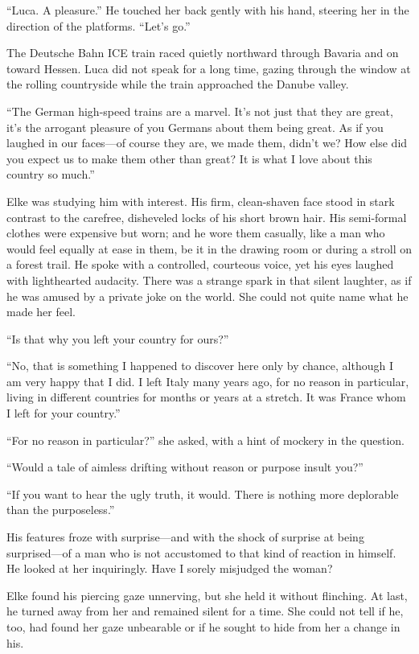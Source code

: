 ``Luca. A pleasure.'' He touched her back gently with his hand, steering her in the direction of the platforms. ``Let's go.''

\sectionline

The Deutsche Bahn ICE train raced quietly northward through Bavaria and on toward Hessen. Luca did not speak for a long time, gazing through the window at the rolling countryside while the train approached the Danube valley.

``The German high-speed trains are a marvel. It's not just that they are great, it's the arrogant pleasure of you Germans about them being great. As if you laughed in our faces---of course they are, we made them, didn't we? How else did you expect us to make them other than great? It is what I love about this country so much.''

Elke was studying him with interest. His firm, clean-shaven face stood in stark contrast to the carefree, disheveled locks of his short brown hair. His semi-formal clothes were expensive but worn; and he wore them casually, like a man who would feel equally at ease in them, be it in the drawing room or during a stroll on a forest trail. He spoke with a controlled, courteous voice, yet his eyes laughed with lighthearted audacity. There was a strange spark in that silent laughter, as if he was amused by a private joke on the world. She could not quite name what he made her feel.

``Is that why you left your country for ours?''

``No, that is something I happened to discover here only by chance, although I am very happy that I did. I left Italy many years ago, for no reason in particular, living in different countries for months or years at a stretch. It was France whom I left for your country.''

``For no reason in particular?'' she asked, with a hint of mockery in the question.

``Would a tale of aimless drifting without reason or purpose insult you?''

``If you want to hear the ugly truth, it would. There is nothing more deplorable than the purposeless.''

His features froze with surprise---and with the shock of surprise at being surprised---of a man who is not accustomed to that kind of reaction in himself. He looked at her inquiringly. Have I sorely misjudged the woman?

Elke found his piercing gaze unnerving, but she held it without flinching. At last, he turned away from her and remained silent for a time. She could not tell if he, too, had found her gaze unbearable or if he sought to hide from her a change in his.

